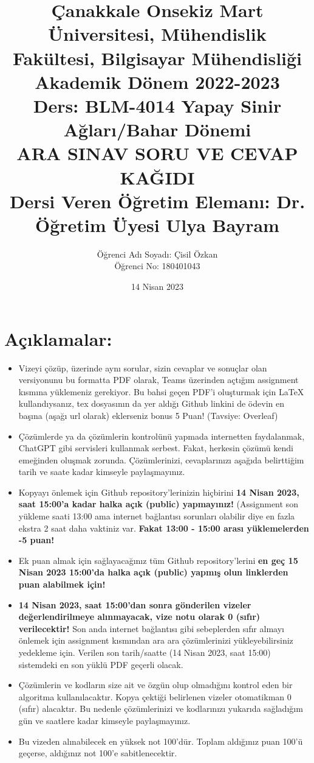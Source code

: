 \documentclass[11pt]{article}
\title{Çanakkale Onsekiz Mart Üniversitesi, Mühendislik Fakültesi, Bilgisayar Mühendisliği Akademik Dönem 2022-2023\\
Ders: BLM-4014 Yapay Sinir Ağları/Bahar Dönemi\\ 
ARA SINAV SORU VE CEVAP KAĞIDI\\
Dersi Veren Öğretim Elemanı: Dr. Öğretim Üyesi Ulya Bayram}
\author{%
\begin{minipage}{\textwidth}
\raggedright
Öğrenci Adı Soyadı: Çisil Özkan \\ %
Öğrenci No: 180401043
\end{minipage}%
}
\date{14 Nisan 2023}
\begin{document}
\maketitle

\vspace{-.5in}
\section*{Açıklamalar:}
\begin{itemize}
    \item Vizeyi çözüp, üzerinde aynı sorular, sizin cevaplar ve sonuçlar olan versiyonunu bu formatta PDF olarak, Teams üzerinden açtığım assignment kısmına yüklemeniz gerekiyor. Bu bahsi geçen PDF'i oluşturmak için LaTeX kullandıysanız, tex dosyasının da yer aldığı Github linkini de ödevin en başına (aşağı url olarak) eklerseniz bonus 5 Puan! (Tavsiye: Overleaf)
    \item Çözümlerde ya da çözümlerin kontrolünü yapmada internetten faydalanmak, ChatGPT gibi servisleri kullanmak serbest. Fakat, herkesin çözümü kendi emeğinden oluşmak zorunda. Çözümlerinizi, cevaplarınızı aşağıda belirttiğim tarih ve saate kadar kimseyle paylaşmayınız. 
    \item Kopyayı önlemek için Github repository'lerinizin hiçbirini \textbf{14 Nisan 2023, saat 15:00'a kadar halka açık (public) yapmayınız!} (Assignment son yükleme saati 13:00 ama internet bağlantısı sorunları olabilir diye en fazla ekstra 2 saat daha vaktiniz var. \textbf{Fakat 13:00 - 15:00 arası yüklemelerden -5 puan!}
    \item Ek puan almak için sağlayacağınız tüm Github repository'lerini \textbf{en geç 15 Nisan 2023 15:00'da halka açık (public) yapmış olun linklerden puan alabilmek için!}
    \item \textbf{14 Nisan 2023, saat 15:00'dan sonra gönderilen vizeler değerlendirilmeye alınmayacak, vize notu olarak 0 (sıfır) verilecektir!} Son anda internet bağlantısı gibi sebeplerden sıfır almayı önlemek için assignment kısmından ara ara çözümlerinizi yükleyebilirsiniz yedekleme için. Verilen son tarih/saatte (14 Nisan 2023, saat 15:00) sistemdeki en son yüklü PDF geçerli olacak.
    \item Çözümlerin ve kodların size ait ve özgün olup olmadığını kontrol eden bir algoritma kullanılacaktır. Kopya çektiği belirlenen vizeler otomatikman 0 (sıfır) alacaktır. Bu nedenle çözümlerinizi ve kodlarınızı yukarıda sağladığım gün ve saatlere kadar kimseyle paylaşmayınız.
    \item Bu vizeden alınabilecek en yüksek not 100'dür. Toplam aldığınız puan 100'ü geçerse, aldığınız not 100'e sabitlenecektir.

\end{itemize}
\end{document}

